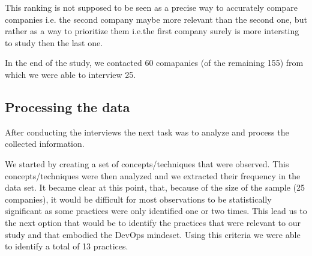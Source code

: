       This ranking is not supposed to be seen as a precise way to accurately compare companies i.e. the second company maybe more relevant than the second one, but rather as a way to prioritize them i.e.the first company surely is more intersting to study then the last one.

      In the end of the study, we contacted 60 comapanies (of the remaining 155) from which we were able to interview 25.

      \subsection{Processing the data}

      After conducting the interviews the next task was to analyze and process the collected information.

      We started by creating a set of concepts/techniques that were observed. This concepts/techniques were then analyzed and we extracted their frequency in the data set. It became clear at this point, that, because of the size of the sample (25 companies), it would be difficult for most observations to be statistically significant as some practices were only identified one or two times. This lead us to the next option that would be to identify the practices that were relevant to our study and that embodied the DevOps mindeset. Using this criteria we were able to identify a total of 13 practices.
